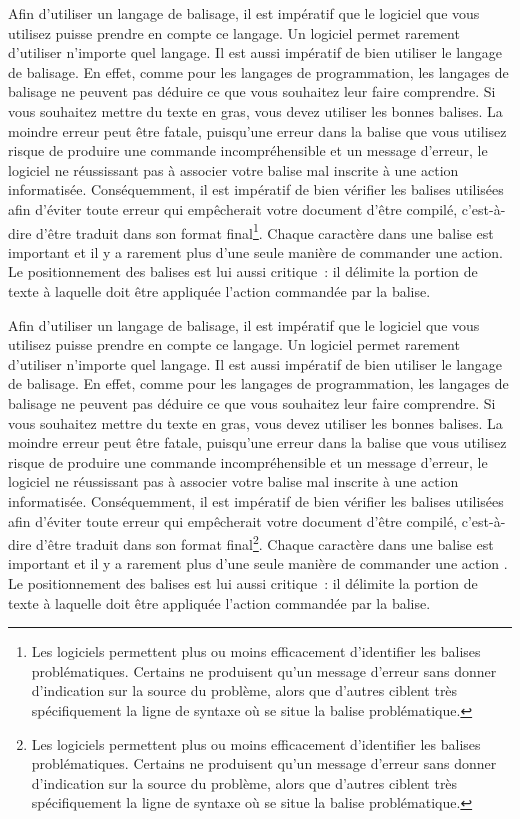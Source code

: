 \documentclass[
  letterpaper,
]{scrbook}
\begin{document}
Afin d'utiliser un langage de balisage, il est impératif que le logiciel
que vous utilisez puisse prendre en compte ce langage. Un logiciel
permet rarement d'utiliser n'importe quel langage. Il est aussi
impératif de bien utiliser le langage de balisage. En effet, comme pour
les langages de programmation, les langages de balisage ne peuvent pas
déduire ce que vous souhaitez leur faire comprendre. Si vous souhaitez
mettre du texte en gras, vous devez utiliser les bonnes balises. La
moindre erreur peut être fatale, puisqu'une erreur dans la balise que
vous utilisez risque de produire une commande incompréhensible et un
message d'erreur, le logiciel ne réussissant pas à associer votre balise
mal inscrite à une action informatisée. Conséquemment, il est impératif
de bien vérifier les balises utilisées afin d'éviter toute erreur qui
empêcherait votre document d'être compilé, c'est-à-dire d'être traduit
dans son format final\footnote{Les logiciels permettent plus ou moins
  efficacement d'identifier les balises problématiques. Certains ne
  produisent qu'un message d'erreur sans donner d'indication sur la
  source du problème, alors que d'autres ciblent très spécifiquement la
  ligne de syntaxe où se situe la balise problématique.}. Chaque
caractère dans une balise est important et il y a rarement plus d'une
seule manière de commander une action. Le positionnement des balises est
lui aussi critique~: il délimite la portion de texte à laquelle doit
être appliquée l'action commandée par la balise.

Afin d'utiliser un langage de balisage, il est impératif que le logiciel
que vous utilisez puisse prendre en compte ce langage. Un logiciel
permet rarement d'utiliser n'importe quel langage. Il est aussi
impératif de bien utiliser le langage de balisage. En effet, comme pour
les langages de programmation, les langages de balisage ne peuvent pas
déduire ce que vous souhaitez leur faire comprendre. Si vous souhaitez
mettre du texte en gras, vous devez utiliser les bonnes balises. La
moindre erreur peut être fatale, puisqu'une erreur dans la balise que
vous utilisez risque de produire une commande incompréhensible et un
message d'erreur, le logiciel ne réussissant pas à associer votre balise
mal inscrite à une action informatisée. Conséquemment, il est impératif
de bien vérifier les balises utilisées afin d'éviter toute erreur qui
empêcherait votre document d'être compilé, c'est-à-dire d'être traduit
dans son format final\footnote{Les logiciels permettent plus ou moins
  efficacement d'identifier les balises problématiques. Certains ne
  produisent qu'un message d'erreur sans donner d'indication sur la
  source du problème, alors que d'autres ciblent très spécifiquement la
  ligne de syntaxe où se situe la balise problématique.}. Chaque
caractère dans une balise est important et il y a rarement plus d'une
seule manière de commander une action . Le positionnement des balises
est lui aussi critique~: il délimite la portion de texte à laquelle doit
être appliquée l'action commandée par la balise.
\end{document}
